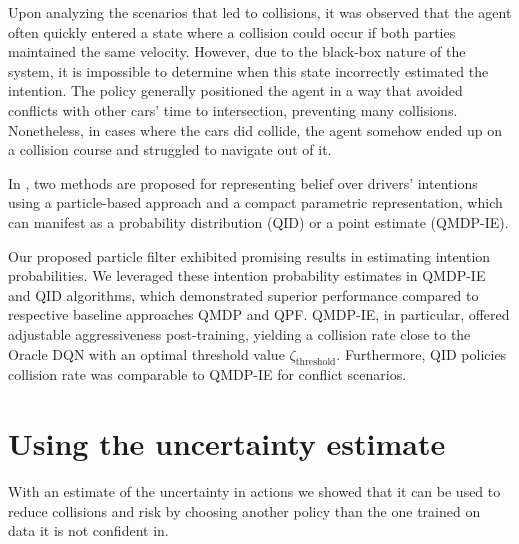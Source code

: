 Upon analyzing the scenarios that led to collisions, it was observed that the agent often quickly entered a state where a collision could occur if both parties maintained the same velocity. However, due to the black-box nature of the system, it is impossible to determine when this state incorrectly estimated the intention. The policy generally positioned the agent in a way that avoided conflicts with other cars' time to intersection, preventing many collisions. Nonetheless, in cases where the cars did collide, the agent somehow ended up on a collision course and struggled to navigate out of it.


In \paperBelief,  two methods are proposed for representing belief over drivers' intentions using a particle-based approach and a compact parametric representation, which can manifest as a probability distribution (QID) or a point estimate (QMDP-IE).

Our proposed particle filter exhibited promising results in estimating intention probabilities.
We leveraged these intention probability estimates in QMDP-IE and QID algorithms, which demonstrated superior performance compared to respective baseline approaches QMDP and QPF. QMDP-IE, in particular, offered adjustable aggressiveness post-training, yielding a collision rate close to the Oracle DQN with an optimal threshold value $\zeta_\mathrm{threshold}$.
Furthermore, QID policies collision rate was comparable to QMDP-IE for conflict scenarios. 



\section{Using the uncertainty estimate}

With an estimate of the uncertainty in actions we showed that it can be used to reduce collisions and risk by choosing another policy than the one trained on data it is not confident in. 

